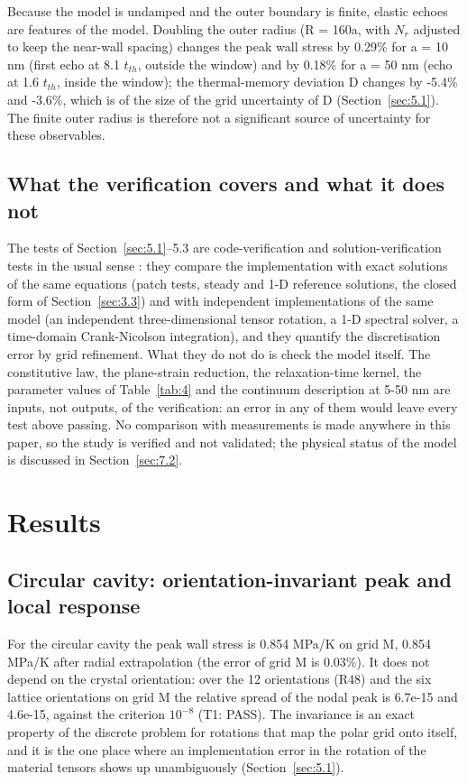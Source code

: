 \documentclass[preprint,12pt]{elsarticle}
\begin{document}
Because the model is undamped and the outer boundary is finite, elastic echoes are features of the model. Doubling the outer radius (R = 160a, with $N_{r}$ adjusted to keep the near-wall spacing) changes the peak wall stress by 0.29\% for a = 10 nm (first echo at 8.1 $t_{th}$, outside the window) and by 0.18\% for a = 50 nm (echo at 1.6 $t_{th}$, inside the window); the thermal-memory deviation D changes by -5.4\% and -3.6\%, which is of the size of the grid uncertainty of D (Section~\ref{sec:5.1}). The finite outer radius is therefore not a significant source of uncertainty for these observables.

\subsection{What the verification covers and what it does not}
\label{sec:5.4}

The tests of Section~\ref{sec:5.1}--5.3 are code-verification and solution-verification tests in the usual sense \cite{oberkampf2010}: they compare the implementation with exact solutions of the same equations (patch tests, steady and 1-D reference solutions, the closed form of Section~\ref{sec:3.3}) and with independent implementations of the same model (an independent three-dimensional tensor rotation, a 1-D spectral solver, a time-domain Crank-Nicolson integration), and they quantify the discretisation error by grid refinement. What they do not do is check the model itself. The constitutive law, the plane-strain reduction, the relaxation-time kernel, the parameter values of Table~\ref{tab:4} and the continuum description at 5-50 nm are inputs, not outputs, of the verification: an error in any of them would leave every test above passing. No comparison with measurements is made anywhere in this paper, so the study is verified and not validated; the physical status of the model is discussed in Section~\ref{sec:7.2}.

\section{Results}
\label{sec:6}

\subsection{Circular cavity: orientation-invariant peak and local response}
\label{sec:6.1}

For the circular cavity the peak wall stress is 0.854 MPa/K on grid M, 0.854 MPa/K after radial extrapolation (the error of grid M is 0.03\%). It does not depend on the crystal orientation: over the 12 orientations (R48) and the six lattice orientations on grid M the relative spread of the nodal peak is 6.7e-15 and 4.6e-15, against the criterion $10^{-8}$ (T1: PASS). The invariance is an exact property of the discrete problem for rotations that map the polar grid onto itself, and it is the one place where an implementation error in the rotation of the material tensors shows up unambiguously (Section~\ref{sec:5.1}).
\end{document}
